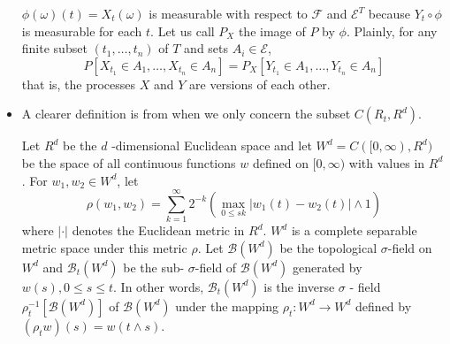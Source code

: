 \begin{itemize}
 $  \phi(\omega)(t)=X_{t}(\omega)  $ 
is measurable with respect to $\mathscr{F}$ and $\mathscr{E}^{T}$ because $Y_{t} \circ \phi$ is measurable for each $t$.  
Let us call $P_{X}$ the image of $P$ by $\phi$.  Plainly, for any finite subset $\left(t_{1}, \ldots, t_{n}\right)$ of $T$ and sets $A_{i} \in \mathscr{E}$,
\[ P\left[X_{t_{1}} \in A_{1}, \ldots, X_{t_{n}} \in A_{n}\right]=P_{X}\left[Y_{t_{1}} \in A_{1}, \ldots, Y_{t_{n}} \in A_{n}\right] \] that is, the processes $X$ and $Y$ are versions of each other.
\item	A clearer definition is from\cite{ikeda2014stochastic} when we only concern the subset $ C(R_t, R^{d})$.
\begin{definition}

	Let $R^{d}$ be the $d$ -dimensional Euclidean space and let $W^{d}=C([0, \infty), R^{d})$ be the space of all continuous functions $w$ defined on $[0, \infty)$ with values in $R^{d}$.  For $w_{1}, w_{2} \in W^{d}$, let \[ \rho\left(w_{1}, w_{2}\right)=\sum_{k=1}^{\infty} 2^{-k}\left(\max _{0 \leq s k}\left|w_{1}(t)-w_{2}(t)\right| \wedge 1\right) \]
	where $|\cdot |$ denotes the Euclidean metric in $ R^{d} $. $W^{d}$ is a complete separable metric space under this metric $\rho$.  Let $\mathscr{B}\left(W^{d}\right)$ be the topological $\sigma$-field on $W^{d}$ and $\mathscr{B}_{t}\left(W^{d}\right)$ be the sub- $\sigma$-field of $\mathscr{B}\left(W^{d}\right)$
	generated by $w(s), 0 \leq s \leq t$. In other words, $\mathscr{B}_{t}\left(W^{d}\right)$ is the inverse $\sigma$ - field $\rho_{t}^{-1}\left[ \mathscr{B}\left(W^{d}\right)\right]$ of $\mathscr{B}\left(W^{d}\right)$ under the mapping $\rho_{t}: W^{d} \longrightarrow W^{d}$ defined by $\left(\rho_{t} w\right)(s)=w(t \wedge s)$.
\end{definition}

\end{itemize}


